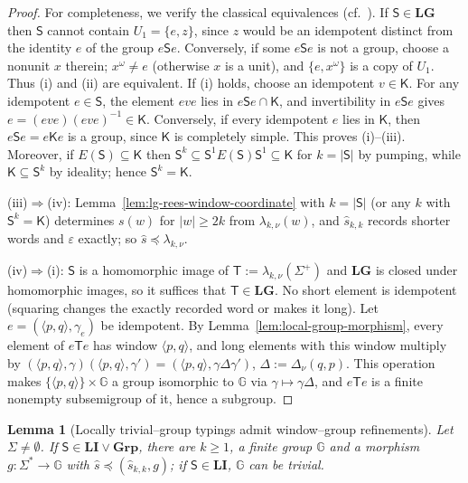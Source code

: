 \documentclass[11pt]{article}
\numberwithin{equation}{section}
\theoremstyle{plain}
\newtheorem{lemma}[theorem]{Lemma}
\theoremstyle{definition}
\theoremstyle{remark}
\newcommand{\eps}{\varepsilon}
\theoremstyle{plain}
\begin{document}
\begin{proof}
For completeness, we verify the classical equivalences (cf.\
\cite[Proposition~2.3]{AlmeidaEtAl2009}).  If $\mathsf S\in\mathbf{LG}$
then $\mathsf S$ cannot contain $U_1=\{e,z\}$, since $z$ would be an idempotent
distinct from the identity $e$ of the group $e\mathsf Se$.
Conversely, if some $e\mathsf Se$ is not a group, choose a nonunit $x$ therein;
$x^\omega\ne e$ (otherwise $x$ is a unit), and
$\{e,x^\omega\}$ is a copy of $U_1$.  Thus (i) and (ii) are equivalent.
If (i) holds, choose an idempotent $v\in\mathsf K$.
For any idempotent $e\in\mathsf S$, the element $eve$ lies in
$e\mathsf Se\cap\mathsf K$, and invertibility in $e\mathsf Se$ gives
$e=(eve)(eve)^{-1}\in\mathsf K$.  Conversely, if every idempotent
$e$ lies in $\mathsf K$, then $e\mathsf Se=e\mathsf Ke$ is a group,
since $\mathsf K$ is completely simple.  This proves (i)--(iii).
Moreover, if $E(\mathsf S)\subseteq\mathsf K$ then
$\mathsf S^k\subseteq\mathsf S^1E(\mathsf S)\mathsf S^1\subseteq\mathsf K$
for $k=|\mathsf S|$ by pumping, while $\mathsf K\subseteq\mathsf S^k$
by ideality; hence $\mathsf S^k=\mathsf K$.

(iii)$\Rightarrow$(iv): Lemma~\ref{lem:lg-rees-window-coordinate} with
$k=|\mathsf S|$ (or any $k$ with $\mathsf S^k=\mathsf K$) determines $s(w)$ for $|w|\ge2k$ from
$\lambda_{k,\nu}(w)$, and $\widehat s_{k,k}$ records shorter words and $\eps$ exactly;
so $\widehat s\preceq\lambda_{k,\nu}$.

(iv)$\Rightarrow$(i): $\mathsf S$ is a homomorphic image of $\mathsf T:=\lambda_{k,\nu}(\Sigma^+)$ and
$\mathbf{LG}$ is closed under homomorphic images, so it suffices that $\mathsf T\in\mathbf{LG}$.
No short element is idempotent (squaring changes the exactly recorded word or makes
it long).  Let $e=(\langle p,q\rangle,\gamma_e)$ be idempotent.  By
Lemma~\ref{lem:local-group-morphism}, every element of $e\mathsf Te$ has window
$\langle p,q\rangle$, and long elements with this window multiply by
$(\langle p,q\rangle,\gamma)(\langle p,q\rangle,\gamma')=(\langle p,q\rangle,\gamma\Delta\gamma')$,
$\Delta:=\Delta_\nu(q,p)$.  This operation makes $\{\langle p,q\rangle\}\times {\mathbb G}$ a group
isomorphic to ${\mathbb G}$ via $\gamma\mapsto\gamma\Delta$, and $e\mathsf Te$ is a finite nonempty
subsemigroup of it, hence a subgroup.
\end{proof}

\begin{lemma}[Locally trivial--group typings admit window--group refinements]
\label{lem:mcfg-li-group-window}
Let $\Sigma\ne\emptyset$.  If $\mathsf S\in\mathbf{LI}\vee\mathbf{Grp}$, there are
$k\ge1$, a finite group ${\mathbb G}$ and a morphism $g:\Sigma^*\to {\mathbb G}$ with
$\widehat s\preceq(\widehat s_{k,k},g)$; if $\mathsf S\in\mathbf{LI}$, ${\mathbb G}$ can be
trivial.
\end{lemma}
\end{document}
